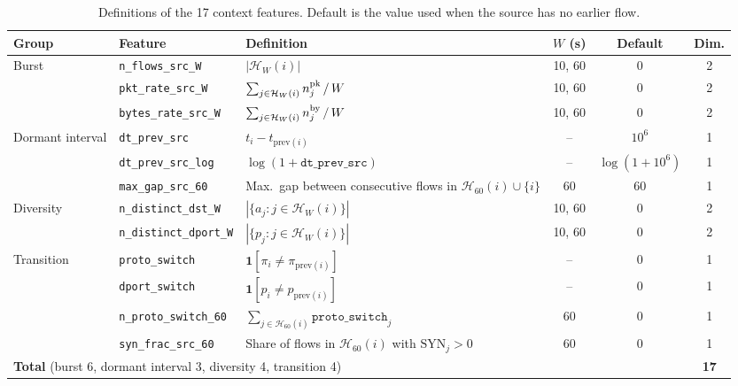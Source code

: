 \documentclass[conference]{IEEEtran}
\begin{document}
\begin{table}[!t]
\centering
\scriptsize
\caption{Definitions of the 17 context
features. Default is the value used when the source has no earlier
flow.}
\label{tab:context_features}
\setlength{\tabcolsep}{6pt}
\renewcommand{\arraystretch}{1.25}
\begin{tabular}{l l >{\raggedright\arraybackslash}p{4.3cm} c c c}
\hline\toprule
\textbf{Group} & \textbf{Feature} & \textbf{Definition} & \textbf{$W$ (s)} & \textbf{Default} & \textbf{Dim.} \\
\hline\toprule
\multirow{3}{*}{Burst}
 & \texttt{n\_flows\_src\_W}    & $|\mathcal{H}_W(i)|$ & 10, 60 & 0 & 2 \\
 & \texttt{pkt\_rate\_src\_W}   & $\sum_{j\in\mathcal{H}_W(i)} n^{\rm pk}_j \,/\, W$ & 10, 60 & 0 & 2 \\
 & \texttt{bytes\_rate\_src\_W} & $\sum_{j\in\mathcal{H}_W(i)} n^{\rm by}_j \,/\, W$ & 10, 60 & 0 & 2 \\
\midrule
\multirow{3}{*}{Dormant interval}
 & \texttt{dt\_prev\_src}     & $t_i-t_{\mathrm{prev}(i)}$ & -- & $10^{6}$ & 1 \\
 & \texttt{dt\_prev\_src\_log} & $\log(1+\texttt{dt\_prev\_src})$ & -- & $\log(1+10^{6})$ & 1 \\
 & \texttt{max\_gap\_src\_60}  & Max.\ gap between consecutive flows in $\mathcal{H}_{60}(i)\cup\{i\}$ & 60 & 60 & 1 \\
\midrule
\multirow{2}{*}{Diversity}
 & \texttt{n\_distinct\_dst\_W}   & $|\{a_j: j\in\mathcal{H}_W(i)\}|$ & 10, 60 & 0 & 2 \\
 & \texttt{n\_distinct\_dport\_W} & $|\{p_j: j\in\mathcal{H}_W(i)\}|$ & 10, 60 & 0 & 2 \\
\midrule
\multirow{4}{*}{Transition}
 & \texttt{proto\_switch}       & $\mathbf{1}[\pi_i\neq\pi_{\mathrm{prev}(i)}]$ & -- & 0 & 1 \\
 & \texttt{dport\_switch}       & $\mathbf{1}[p_i\neq p_{\mathrm{prev}(i)}]$ & -- & 0 & 1 \\
 & \texttt{n\_proto\_switch\_60} & $\sum_{j\in\mathcal{H}_{60}(i)} \texttt{proto\_switch}_j$ & 60 & 0 & 1 \\
 & \texttt{syn\_frac\_src\_60}  & Share of flows in $\mathcal{H}_{60}(i)$ with $\mathrm{SYN}_j>0$ & 60 & 0 & 1 \\
\midrule
\multicolumn{5}{l}{\textbf{Total} (burst 6, dormant interval 3, diversity 4, transition 4)} & \textbf{17} \\
\hline\toprule
\end{tabular}
\end{table}
\end{document}
